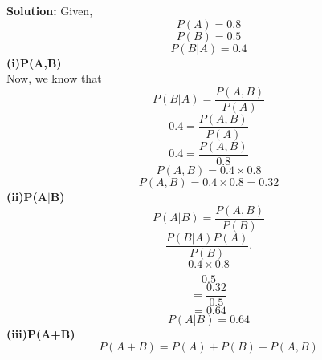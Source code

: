 \documentclass{article}
\begin{document}
\begin{enumerate}[label=13.\arabic{enumi}.\arabic{enumii}]
\textbf{Solution:}
 Given,\\
 \begin{equation}
 P(A)=0.8
 \end{equation}
 \begin{equation}
 P(B)=0.5
 \end{equation}
 \begin{equation}
 P(B \vert A)=0.4
 \end{equation}
 \textbf{(i)}\textbf{P(A,B)} 
 \vspace{0.25cm}\\
 Now, we know that
 \vspace{0.25cm}\\
 \begin{equation}
 P(B \vert A)= \frac{P (A , B)}{P(A)}
 \end{equation}
 \begin{equation}
 0.4=\frac{P (A, B)}{P(A)}
 \end{equation}
 \begin{equation}
 0.4=\frac{P (A, B)}{0.8}
 \end{equation}
 \begin{equation}
 P (A,B)=0.4 \times 0.8
 \end{equation}
 \begin{equation}
 \boxed{P (A,B)=0.4 \times 0.8=0.32}
 \end{equation}
 \textbf{(ii)}\textbf{P(A$\vert$B)}
 \vspace{0.25cm}\\
 \begin{equation}
 P(A \vert B)= \frac{P (A,B)}{P(B)}
 \end{equation}
 \begin{equation}
 \frac{P (B \vert A)P(A)}{P(B)}.
 \end{equation}
 \begin{equation}
  \frac{0.4 \times 0.8}{0.5}
 \end{equation}
 \begin{equation}
 = \frac{0.32}{0.5}
 \end{equation}
  \begin{equation}
 = 0.64
 \end{equation}
  \begin{equation}
\boxed{P(A \vert B) = 0.64}
 \end{equation}
  \textbf{(iii)}\textbf{P(A+B)}
 \vspace{0.25cm}\\
 \begin{equation}
 P(A+B)= P(A)+P(B)-P(A, B)

\end{equation}
\end{enumerate}
\end{document}
